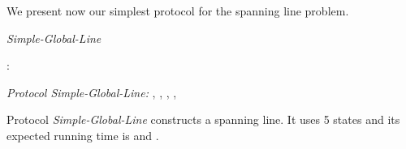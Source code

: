 \documentclass[oribibl, 11pt]{llncs}
\begin{document}
We present now our simplest protocol for the spanning line problem.

\renewcommand{\algorithmiccomment}[1]{// #1}
\begin{algorithm}[!h]
  \caption{\emph{Simple-Global-Line}}\label{prot:gline}
  \begin{algorithmic}
    \medskip
    \State 
    \State : 
    
    \State {}
  \end{algorithmic}
\end{algorithm}

\noindent\emph{Protocol Simple-Global-Line:} , , , , 

\begin{theorem} \label{the:gline}
Protocol \emph{Simple-Global-Line} constructs a spanning line. It uses 5 states and its expected running time is  and .
\end{theorem}
\end{document}
